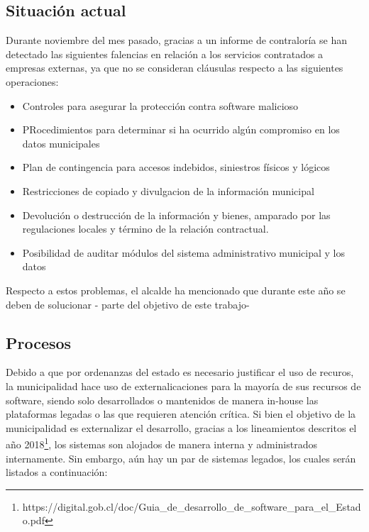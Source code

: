 \subsection{Situación actual}


Durante noviembre del mes pasado, gracias a un informe de contraloría se han detectado las siguientes falencias en relación a los servicios contratados a empresas externas, ya que no se consideran cláusulas respecto a las siguientes operaciones:

\begin{itemize}
    \item Controles para asegurar la protección contra software malicioso
    \item PRocedimientos para determinar si ha ocurrido algún compromiso en los datos municipales
    \item Plan de contingencia para accesos indebidos, siniestros físicos y lógicos
    \item Restricciones de copiado y divulgacion de la información municipal
    \item Devolución o destrucción de la información y bienes, amparado por las regulaciones locales y término de la relación contractual.
    \item Posibilidad de auditar módulos del sistema administrativo municipal y los datos
\end{itemize}

Respecto a estos problemas, el alcalde ha mencionado que durante este año se deben de solucionar - parte del objetivo de este trabajo-

\subsection{Procesos}

Debido a que por ordenanzas del estado es necesario justificar el uso de recuros, la municipalidad hace uso de externalicaciones para la mayoría de sus recursos de software, siendo solo desarrollados o mantenidos de manera in-house las plataformas legadas o las que requieren atención crítica. Si bien el objetivo de la municipalidad es externalizar el desarrollo, gracias a los lineamientos descritos el año 2018\footnote{https://digital.gob.cl/doc/Guia_de_desarrollo_de_software_para_el_Estado.pdf}, los sistemas son alojados de manera interna y administrados internamente. Sin embargo, aún hay un par de sistemas legados, los cuales serán listados a continuación:


